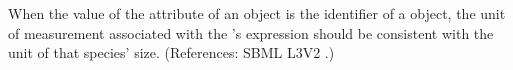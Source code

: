 When the value of the attribute  of an \EventAssignment
object is the identifier of a \Species object, the unit of measurement
associated with the \EventAssignment's  expression should be
consistent with the unit of that species' size.  (References: SBML L3V2
.)
